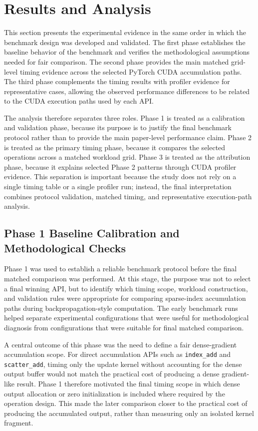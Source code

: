 \section{Results and Analysis}
\label{sec:results-analysis}

This section presents the experimental evidence in the same order in which the benchmark design was developed and validated. The first phase establishes the baseline behavior of the benchmark and verifies the methodological assumptions needed for fair comparison. The second phase provides the main matched grid-level timing evidence across the selected PyTorch CUDA accumulation paths. The third phase complements the timing results with profiler evidence for representative cases, allowing the observed performance differences to be related to the CUDA execution paths used by each API.

The analysis therefore separates three roles. Phase 1 is treated as a calibration and validation phase, because its purpose is to justify the final benchmark protocol rather than to provide the main paper-level performance claim. Phase 2 is treated as the primary timing phase, because it compares the selected operations across a matched workload grid. Phase 3 is treated as the attribution phase, because it explains selected Phase 2 patterns through CUDA profiler evidence. This separation is important because the study does not rely on a single timing table or a single profiler run; instead, the final interpretation combines protocol validation, matched timing, and representative execution-path analysis.

\subsection{Phase 1 Baseline Calibration and Methodological Checks}

Phase 1 was used to establish a reliable benchmark protocol before the final matched comparison was performed. At this stage, the purpose was not to select a final winning API, but to identify which timing scope, workload construction, and validation rules were appropriate for comparing sparse-index accumulation paths during backpropagation-style computation. The early benchmark runs helped separate experimental configurations that were useful for methodological diagnosis from configurations that were suitable for final matched comparison.

A central outcome of this phase was the need to define a fair dense-gradient accumulation scope. For direct accumulation APIs such as \texttt{index\_add} and \texttt{scatter\_add}, timing only the update kernel without accounting for the dense output buffer would not match the practical cost of producing a dense gradient-like result. Phase 1 therefore motivated the final timing scope in which dense output allocation or zero initialization is included where required by the operation design. This made the later comparison closer to the practical cost of producing the accumulated output, rather than measuring only an isolated kernel fragment.

